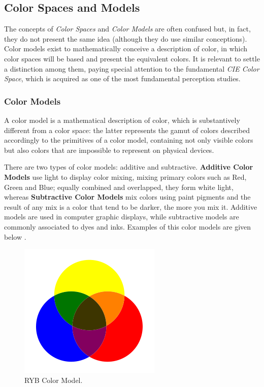 \documentclass{report}
\begin{document}
\subsection{Color Spaces and Models}
The concepts of \emph{Color Spaces} and \emph{Color Models} are often confused but, in fact, they do not present the same idea
(although they do use similar conceptions). Color models exist to mathematically conceive a description of color,
in which color spaces will be based and present the equivalent colors. It is relevant to settle a distinction among
them, paying special attention to the fundamental \emph{CIE Color Space}, which is acquired as one of the most
fundamental perception studies.
%
\subsubsection{Color Models}
A color model is a mathematical description of color, which is substantively different from a color space: the latter represents
the gamut of colors described accordingly to the primitives of a color model, containing not only visible colors
but also colors that are impossible to represent on physical devices. \par
There are two types of color models: additive and subtractive. \textbf{Additive Color Models} use light
to display color mixing, mixing primary colors such as Red, Green and Blue; equally combined and
overlapped, they form white light, whereas \textbf{Subtractive Color Models} mix colors using paint pigments
and the result of any mix is a color that tend to be darker, the more you mix it. Additive models are used
in computer graphic displays, while subtractive models are commonly associated to dyes and inks. Examples
of this color models are given below \cite{Ware2012}. \par
%
\begin{figure}
  \centering
  \vspace{-2\baselineskip}
  \includegraphics[width=\linewidth]{RYB.png}
  \caption[RYB Color Model Schematic]{RYB Color Model.\protect\footnotemark{}}
  \label{fig:RYB}
\end{figure}
\end{document}
